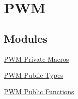 \hypertarget{group___p_w_m}{\section{\-P\-W\-M}
\label{group___p_w_m}
}
\subsection*{\-Modules}
\begin{DoxyCompactItemize}
\item 
\hyperlink{group___p_w_m___private___macros}{\-P\-W\-M Private Macros}
\item 
\hyperlink{group___p_w_m___public___types}{\-P\-W\-M Public Types}
\item 
\hyperlink{group___p_w_m___public___functions}{\-P\-W\-M Public Functions}
\end{DoxyCompactItemize}
